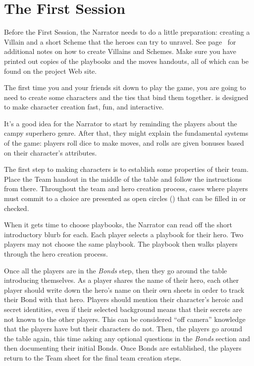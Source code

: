 \documentclass[letterpaper]{report}
\begin{document}
\section{The First Session}

Before the First Session, the Narrator needs to do a little
preparation: creating a Villain and a short Scheme
that the heroes can try to unravel.
See page~\pageref{sec:session-prep} for additional notes
on how to create Villains and Schemes.
Make sure you have printed out copies of the playbooks and the moves
handouts, all of which can be found on the \kapow{} project Web site.

The first time you and your friends sit down to play the game,
you are going to need to create some characters and the ties
that bind them together.
\kapow{} is designed to make character creation fast, fun,
and interactive.

It's a good idea for the Narrator to start by reminding the players
about the campy superhero genre.
After that, they might explain the fundamental systems of the game:
players roll dice to make moves, and rolls are given bonuses
based on their character's attributes. 

The first step to making characters is to establish some
properties of their team.
Place the Team handout in the middle of the table and follow
the instructions from there.
Throughout the team and hero creation process,
cases where players must commit to a choice
are presented as open circles () that
can be filled in or checked.

When it gets time to choose playbooks, the Narrator can read off
the short introductory blurb for each.
Each player selects a playbook for their hero. Two players may not
choose the same playbook.
The playbook then walks players through the hero creation process.

Once all the players are in the \emph{Bonds} step, then they go around
the table introducing themselves.
As a player shares the name of their hero, each other player should
write down the hero's name on their own sheets in order to
track their Bond with that hero.
Players should 
mention their character's heroic and secret identities, even if their selected
background means that their secrets are not known to the other
players. This can be considered ``off camera'' knowledge that the
players have but their characters do not.
Then, the players go around the table again, this time asking
any optional questions in the \emph{Bonds} section and then documenting
their initial Bonds.
Once Bonds are established, the players return to the Team sheet
for the final team creation steps.
\end{document}
